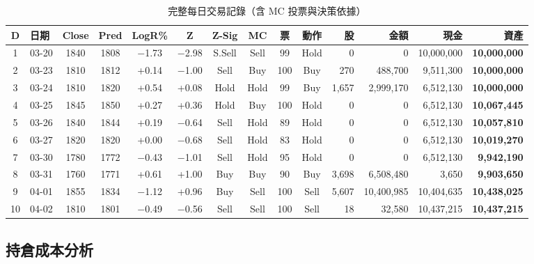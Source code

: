 \documentclass[12pt,a4paper]{article}
\begin{document}
\begin{table}[H]
\centering
\caption{完整每日交易記錄（含 MC 投票與決策依據）}
\tiny
\begin{tabular}{clccccccccrrrr}
\toprule
\textbf{D} & \textbf{日期} & \textbf{Close} & \textbf{Pred} & \textbf{LogR\%} & \textbf{Z} & \textbf{Z-Sig} & \textbf{MC} & \textbf{票} & \textbf{動作} & \textbf{股} & \textbf{金額} & \textbf{現金} & \textbf{資產} \\
\midrule
1 & 03-20 & 1840 & 1808 & $-$1.73 & $-$2.98 & S.Sell & Sell & 99 & Hold & 0     & 0         & 10,000,000 & \textbf{10,000,000} \\
2 & 03-23 & 1810 & 1812 & +0.14 & $-$1.00 & Sell  & Buy  & 100 & Buy  & 270   & 488,700   & 9,511,300  & \textbf{10,000,000} \\
3 & 03-24 & 1810 & 1820 & +0.54 & +0.08 & Hold  & Hold & 99  & Buy  & 1,657 & 2,999,170 & 6,512,130  & \textbf{10,000,000} \\
4 & 03-25 & 1845 & 1850 & +0.27 & +0.36 & Hold  & Buy  & 100 & Hold & 0     & 0         & 6,512,130  & \textbf{10,067,445} \\
5 & 03-26 & 1840 & 1844 & +0.19 & $-$0.64 & Sell  & Hold & 89  & Hold & 0     & 0         & 6,512,130  & \textbf{10,057,810} \\
6 & 03-27 & 1820 & 1820 & +0.00 & $-$0.68 & Sell  & Hold & 83  & Hold & 0     & 0         & 6,512,130  & \textbf{10,019,270} \\
7 & 03-30 & 1780 & 1772 & $-$0.43 & $-$1.01 & Sell  & Hold & 95  & Hold & 0     & 0         & 6,512,130  & \textbf{9,942,190} \\
8 & 03-31 & 1760 & 1771 & +0.61 & +1.00 & Buy   & Buy  & 90  & Buy  & 3,698 & 6,508,480 & 3,650      & \textbf{9,903,650} \\
\rowcolor{bestrow}
9 & 04-01 & 1855 & 1834 & $-$1.12 & +0.96 & Buy   & Sell & 100 & Sell & 5,607 & 10,400,985& 10,404,635 & \textbf{10,438,025} \\
10& 04-02 & 1810 & 1801 & $-$0.49 & $-$0.56 & Sell  & Sell & 100 & Sell & 18    & 32,580    & 10,437,215 & \textbf{10,437,215} \\
\bottomrule
\end{tabular}
\end{table}

\subsection{持倉成本分析}
\end{document}
